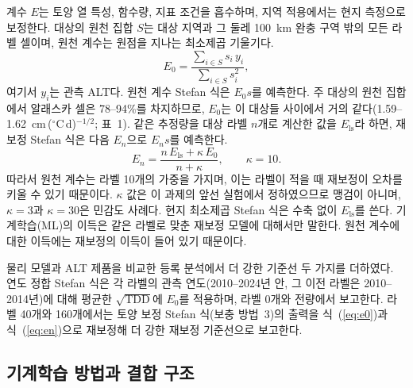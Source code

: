 계수 $E$는 토양 열 특성, 함수량, 지표 조건을 흡수하며, 지역 적용에서는 현지 측정으로 보정한다\cite{Nelson1997}. 대상의 원천 집합 $S$는 대상 지역과 그 둘레 100~km 완충 구역 밖의 모든 라벨 셀이며, 원천 계수는 원점을 지나는 최소제곱 기울기다.
\begin{equation}
E_0 = \frac{\sum_{i \in S} s_i\, y_i}{\sum_{i \in S} s_i^2},
\label{eq:e0}
\end{equation}
여기서 $y_i$는 관측 ALT다. 원천 계수 Stefan 식은 $E_0 s$를 예측한다. 주 대상의 원천 집합에서 알래스카 셀은 78--94\%를 차지하므로, $E_0$는 이 대상들 사이에서 거의 같다(1.59--1.62~cm\,($^{\circ}$C\,d)$^{-1/2}$; 표~1). 같은 추정량을 대상 라벨 $n$개로 계산한 값을 $E_{\mathrm{ls}}$라 하면, 재보정 Stefan 식은 다음 $E_n$으로 $E_n s$를 예측한다.
\begin{equation}
E_n = \frac{n\, E_{\mathrm{ls}} + \kappa\, E_0}{n + \kappa}, \qquad \kappa = 10.
\label{eq:en}
\end{equation}
따라서 원천 계수는 라벨 10개의 가중을 가지며, 이는 라벨이 적을 때 재보정이 오차를 키울 수 있기 때문이다\cite{Steyerberg2004}. $\kappa$ 값은 이 과제의 앞선 실험에서 정하였으므로 맹검이 아니며, $\kappa = 3$과 $\kappa = 30$은 민감도 사례다. 현지 최소제곱 Stefan 식은 수축 없이 $E_{\mathrm{ls}}$를 쓴다. 기계학습(ML)의 이득은 같은 라벨로 맞춘 재보정 모델에 대해서만 말한다. 원천 계수에 대한 이득에는 재보정의 이득이 들어 있기 때문이다.

물리 모델과 ALT 제품을 비교한 등록 분석에서 더 강한 기준선 두 가지를 더하였다. 연도 정합 Stefan 식은 각 라벨의 관측 연도(2010--2024년 안, 그 이전 라벨은 2010--2014년)에 대해 평균한 $\sqrt{\mathrm{TDD}}$에 $E_0$를 적용하며, 라벨 0개와 전량에서 보고한다. 라벨 40개와 160개에서는 토양 보정 Stefan 식(보충 방법~3)의 출력을 식~(\ref{eq:e0})과 식~(\ref{eq:en})으로 재보정해 더 강한 재보정 기준선으로 보고한다.

\subsection{기계학습 방법과 결합 구조}\label{sec:m-ml}

